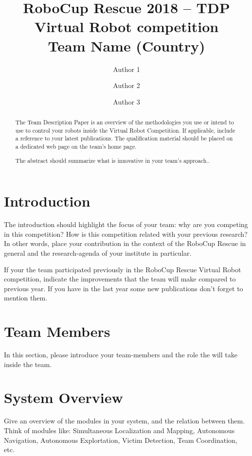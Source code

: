 \documentclass[runningheads,a4paper]{llncs}
\begin{document}
\title{RoboCup Rescue 2018 -- TDP Virtual Robot competition\\
       Team Name (Country)}
\author{Author 1 \and Author 2 \and Author 3}
\maketitle
\begin{abstract}
The Team Description Paper is an overview of the methodologies you use or intend to use to control your robots inside the Virtual Robot Competition. If applicable, include a reference to your latest publications. The qualification material should be placed on a dedicated web page on the team's home page. 

The abstract should summarize what is innovative in your team's approach..
\end{abstract}
\section{Introduction}
The introduction should highlight the focus of your team: why are you competing in this competition?
How is this competition related with your previous research? In other words, place your contribution
in the context of the RoboCup Rescue in general and the research-agenda of your institute in particular.

If your the team participated previously in the RoboCup Rescue Virtual Robot competition, indicate
the improvements that the team will make compared to previous year. If you have in the last year some 
new publications don't forget to mention them.
\section{Team Members}
In this section, please introduce your team-members and the role the will take inside the team.
\section{System Overview}
Give an overview of the modules in your system, and the relation between them.
Think of modules like: Simultaneous Localization and Mapping, Autonomous Navigation, Autonomous Explortation, Victim Detection, Team Coordination, etc.
\end{document}

